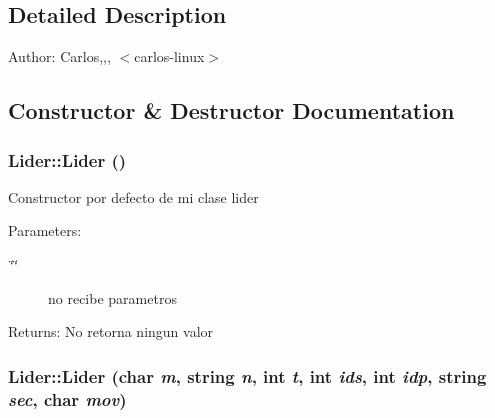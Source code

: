 \subsection{Detailed Description}
\begin{Desc}
\item[Author:]Carlos,,, $<$carlos-linux$>$ \end{Desc}


\subsection{Constructor \& Destructor Documentation}
\hypertarget{classLider_bbdd9719261866f4f316620b4319d7e6}{
\subsubsection[Lider]{\setlength{\rightskip}{0pt plus 5cm}Lider::Lider ()}}
\label{classLider_bbdd9719261866f4f316620b4319d7e6}


Constructor por defecto de mi clase lider \begin{Desc}
\item[Parameters:]
\begin{description}
\item[{\em \char`\"{}\char`\"{}}]no recibe parametros \end{description}
\end{Desc}
\begin{Desc}
\item[Returns:]No retorna ningun valor \end{Desc}
\hypertarget{classLider_16da42712d18eb29d78b81613f3d916d}{
\subsubsection[Lider]{\setlength{\rightskip}{0pt plus 5cm}Lider::Lider (char {\em m}, \/  string {\em n}, \/  int {\em t}, \/  int {\em ids}, \/  int {\em idp}, \/  string {\em sec}, \/  char {\em mov})}}
\label{classLider_16da42712d18eb29d78b81613f3d916d}


